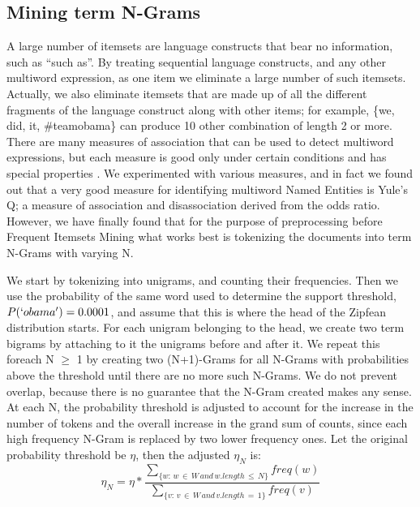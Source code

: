 \documentclass{sig-alternate}
\begin{document}
\subsection{Mining term N-Grams}
\label{sec:ngrams}

A large number of itemsets are language constructs that bear no information, such as ``such as''.  By treating sequential language constructs, and any other multiword expression, as one item we eliminate a large number of such itemsets. Actually, we also eliminate itemsets that are made up of all the different fragments of the language construct along with other items; for example, \{we, did, it, \#teamobama\} can produce 10 other combination of length 2 or more. There are many measures of association that can be used to detect multiword expressions, but each measure is good only under certain conditions and has special properties \cite{ramisch2012broad}. We experimented with various measures, and in fact we found out that a very good measure for identifying multiword Named Entities is Yule's Q; a measure of association and disassociation derived from the odds ratio. However, we have finally found that for the purpose of preprocessing before Frequent Itemsets Mining what works best is tokenizing the documents into term N-Grams with varying N. 

We start by tokenizing into unigrams, and counting their frequencies. Then we use the probability of the same word used to determine the support threshold, $P(`obama') = 0.0001$, and assume that this is where the head of the Zipfean distribution starts. For each unigram belonging to the head, we create two term bigrams by attaching to it the unigrams before and after it. We repeat this foreach N $\ge$ 1 by creating two (N+1)-Grams for all N-Grams with probabilities above the threshold until there are no more such N-Grams. We do not prevent overlap, because there is no guarantee that the N-Gram created makes any sense. At each N, the probability threshold is adjusted to account for the increase in the number of tokens and the overall increase in the grand sum of counts, since each high frequency N-Gram is replaced by two lower frequency ones. Let the original probability threshold be $\eta$, then the adjusted $\eta_N$ is:
\begin{equation}\eta_N = \eta * \frac{\sum_{\{w:\, w \,\in\, W\, and\, w.length \,\le\, N\}}{freq(w)}}{\sum_{\{v:\, v\, \in\, W \,and \,v.length\,=\,1\}}{freq(v)}}\end{equation}
\end{document}
